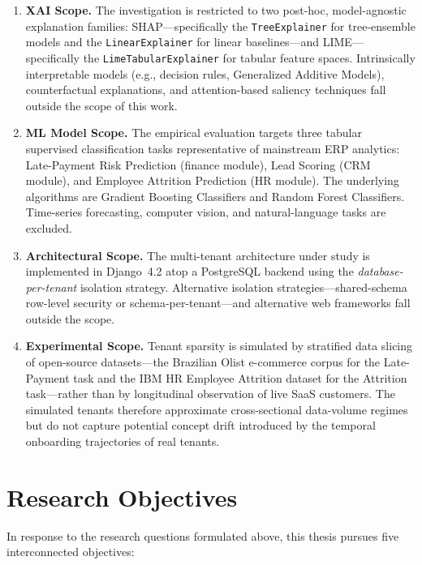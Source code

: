\begin{enumerate}[label=\arabic*.]
  \item \textbf{XAI Scope.} The investigation is restricted to two post-hoc, model-agnostic explanation families: SHAP---specifically the \texttt{TreeExplainer} for tree-ensemble models and the \texttt{LinearExplainer} for linear baselines---and LIME---specifically the \texttt{LimeTabularExplainer} for tabular feature spaces. Intrinsically interpretable models (e.g., decision rules, Generalized Additive Models), counterfactual explanations, and attention-based saliency techniques fall outside the scope of this work.

  \item \textbf{ML Model Scope.} The empirical evaluation targets three tabular supervised classification tasks representative of mainstream ERP analytics: Late-Payment Risk Prediction (finance module), Lead Scoring (CRM module), and Employee Attrition Prediction (HR module). The underlying algorithms are Gradient Boosting Classifiers and Random Forest Classifiers. Time-series forecasting, computer vision, and natural-language tasks are excluded.

  \item \textbf{Architectural Scope.} The multi-tenant architecture under study is implemented in Django~4.2 atop a PostgreSQL backend using the \emph{database-per-tenant} isolation strategy. Alternative isolation strategies---shared-schema row-level security or schema-per-tenant---and alternative web frameworks fall outside the scope.

  \item \textbf{Experimental Scope.} Tenant sparsity is simulated by stratified data slicing of open-source datasets---the Brazilian Olist e-commerce corpus for the Late-Payment task and the IBM HR Employee Attrition dataset for the Attrition task---rather than by longitudinal observation of live SaaS customers. The simulated tenants therefore approximate cross-sectional data-volume regimes but do not capture potential concept drift introduced by the temporal onboarding trajectories of real tenants.
\end{enumerate}

\section{Research Objectives}
\label{sec:objectives}

In response to the research questions formulated above, this thesis pursues five interconnected objectives:

